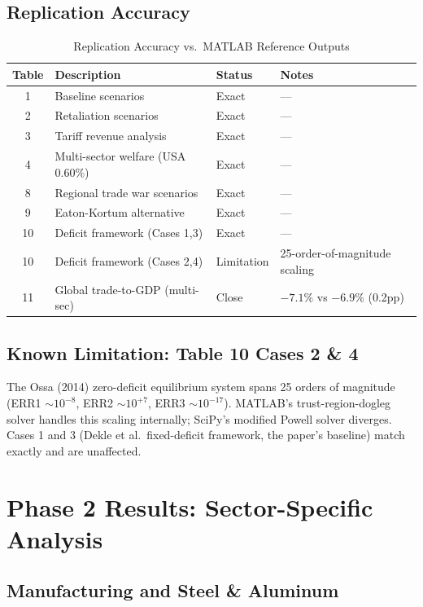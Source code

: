 \documentclass[12pt]{article}
\begin{document}
\subsection{Replication Accuracy}

\begin{table}[H]
\centering
\caption{Replication Accuracy vs.\ MATLAB Reference Outputs}
\label{tab:replication_status}
\begin{tabular}{clll}
\toprule
Table & Description & Status & Notes \\
\midrule
1 & Baseline scenarios             & Exact & --- \\
2 & Retaliation scenarios          & Exact & --- \\
3 & Tariff revenue analysis        & Exact & --- \\
4 & Multi-sector welfare (USA 0.60\%) & Exact & --- \\
8 & Regional trade war scenarios   & Exact & --- \\
9 & Eaton-Kortum alternative       & Exact & --- \\
10 & Deficit framework (Cases 1,3) & Exact & --- \\
10 & Deficit framework (Cases 2,4) & Limitation & 25-order-of-magnitude scaling \\
11 & Global trade-to-GDP (multi-sec) & Close & $-7.1\%$ vs $-6.9\%$ (0.2pp) \\
\bottomrule
\end{tabular}
\end{table}

\subsection{Known Limitation: Table 10 Cases 2 \& 4}

The Ossa (2014) zero-deficit equilibrium system spans 25 orders of
magnitude (ERR1 $\sim 10^{-8}$, ERR2 $\sim 10^{+7}$, ERR3 $\sim
10^{-17}$). MATLAB's trust-region-dogleg solver handles this scaling
internally; SciPy's modified Powell solver diverges. Cases 1 and 3
(Dekle et al.\ fixed-deficit framework, the paper's baseline) match
exactly and are unaffected.

\section{Phase 2 Results: Sector-Specific Analysis}

\subsection{Manufacturing and Steel \& Aluminum}
\end{document}
